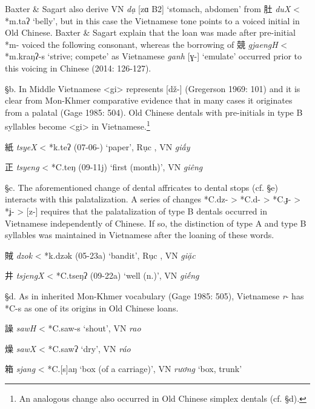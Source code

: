 Baxter \& Sagart also derive VN \emph{dạ} {[}zɑ B2] `stomach, abdomen'
from 肚 \emph{duX} \textless{} *m.t{}aʔ `belly', but in this case the
Vietnamese tone points to a voiced initial in Old Chinese. Baxter \&
Sagart explain that the loan was made after pre-initial *m- voiced the
following consonant, whereas the borrow­ing of 競  \emph{gjaengH}
\textless{} *m.kraŋʔ-s `strive; compete' as Vietnamese \emph{ganh}
{[}ɣ-] `emulate' occurred prior to this voicing in Chinese (2014:
126-127).

§b. In Middle Vietnamese \textless{}gi\textgreater{} represents
{[}dž-] (Gregerson 1969: 101) and it is clear from Mon-Khmer
comparative evidence that in many cases it originates from a palatal
(Gage 1985: 504). Old Chinese dentals with pre-initials in type B
syllables become \textless{}gi\textgreater{} in Vietnamese.\footnote{An
  analogous change also occurred in Old Chinese simplex dentals (cf.
  §d).}

\begin{description} \item
紙 \emph{tsyeX} \textless{} *k.teʔ (07-06-) `paper', Rục \emph{},
VN \emph{giấy}

\item
正 \emph{tsyeng} \textless{} *C.teŋ (09-11j) `first (month)', VN
\emph{giêng}
\end{description}

§c. The aforementioned change of dental affricates to dental stops (cf.
§e) interacts with this palatal­ization. A series of changes *C.dz-
\textgreater{} *C.d- \textgreater{} *C.ɟ- \textgreater{} *ʝ-
\textgreater{} {[}z-] requires that the palatalization of type B
dentals occurred in Vietnamese independently of Chinese. If so, the
distinction of type A and type B syllables was maintained in Vietnamese
after the loaning of these words.

\begin{description} \item
賊 \emph{dzok} \textless{} *k.dz{}ək (05-23a) `bandit', Rục \emph{},
VN \emph{giặc}

\item
井 \emph{tsjengX} \textless{} *C.tseŋʔ (09-22a) `well (n.)', VN
 \emph{giếng}
\end{description}

§d. As in inherited Mon-Khmer vocabulary (Gage 1985: 505), Vietnamese
 \emph{r}- has *C-s as one of its origins in Old Chinese loans.

\begin{description} \item
譟 \emph{sawH} \textless{} *C.s{}aw-s `shout', VN \emph{rao}

\item
燥 \emph{sawX} \textless{} *C.s{}awʔ `dry', VN \emph{ráo}

\item
箱 \emph{sjang} \textless{} *C.{[}s]aŋ `box (of a carriage)', VN
 \emph{rương} `box, trunk'
\end{description}

